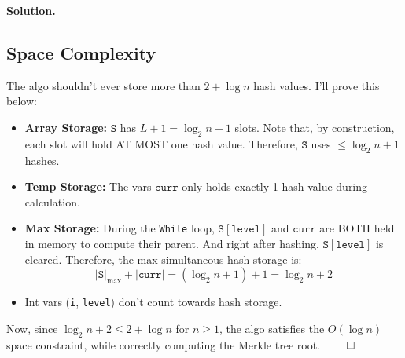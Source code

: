 \documentclass[12pt]{article}
\theoremstyle{definition}
\newcommand{\addbigskip}{\addvspace{\bigskipamount}}
\newenvironment{solution}
     {\addbigskip
      \noindent\color{blue}\textbf{Solution.\ }}
     {\par\addbigskip}
\newenvironment{solution}
     {\comment}
     {\endcomment}
\begin{document}
\begin{solution}
\subsection*{Space Complexity}
The algo shouldn't ever store more than $2 + \log n$ hash values. I'll prove this below:
\begin{itemize}
    \item \textbf{Array Storage:} $\texttt{S}$ has $L+1 = \log_2 n + 1$ slots. Note that, by construction, each slot will hold AT MOST one hash value. Therefore, $\texttt{S}$ uses $\le \log_2 n + 1$ hashes.
    \item \textbf{Temp Storage:} The vars $\texttt{curr}$ only holds exactly 1 hash value during calculation.
    \item \textbf{Max Storage:} During the \texttt{While} loop, $\texttt{S}[\texttt{level}]$ and $\texttt{curr}$ are BOTH held in memory to compute their parent. And right after hashing, $\texttt{S}[\texttt{level}]$ is cleared. Therefore, the max simultaneous hash storage is:
    \begin{equation*}
        |\texttt{S}|_{\max} + |\texttt{curr}| = (\log_2 n + 1) + 1 = \log_2 n + 2
    \end{equation*}
    \item Int vars (\texttt{i}, \texttt{level}) don't count towards hash storage.
\end{itemize}
Now, since $\log_2 n + 2 \le 2 + \log n$ for $n \ge 1$, the algo satisfies the $O(\log n)$ space constraint, while correctly computing the Merkle tree root. $\qed$
\end{solution}
\end{document}
